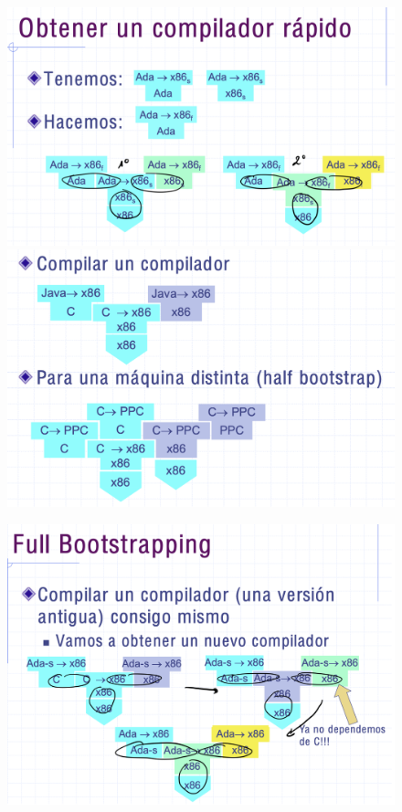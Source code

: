 \documentclass[12pt, twoside, openright]{report} %
\begin{document}
\begin{figure}[H]
	{\includegraphics[scale=.15]{Untitled 22.png}
	\includegraphics[scale=.15]{Untitled 23.png}}
\end{figure}

\begin{figure}[H]
	{\includegraphics[scale=.2]{Untitled 24.png}}
\end{figure}
\end{document}
